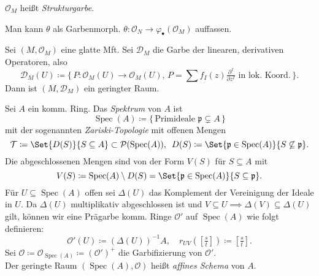 \documentclass{cheat-sheet}
\renewcommand{\O}{\mathcal{O}} %
\newcommand{\Tau}{\mathcal{T}} %
\DeclareMathOperator{\Spec}{Spec} %
\newcommand{\Pow}{\mathcal{P}} %
\begin{document}
\begin{sprech}
  $\O_M$ heißt \emph{Strukturgarbe}.
\end{sprech}


\begin{bem}
  Man kann $\theta$ als Garbenmorph. $\theta : \O_N \to \varphi_\bullet(\O_M)$ auffassen.
\end{bem}

\begin{bsp}
  Sei $(M, \O_M)$ eine glatte Mft. Sei $\mathcal{D}_M$ die Garbe der linearen, derivativen Operatoren, also
  \[ \mathcal{D}_M(U) \!\coloneqq\! \{ \, P \!:\! \O_M(U) \!\to\! \O_M(U), \, P \!=\! \sum f_I(z) \tfrac{\partial^I}{\partial z^I} \text{ in lok. Koord.} \, \}. \]
  Dann ist $(M, \mathcal{D}_M)$ ein geringter Raum. %
\end{bsp}



\begin{defn}
  Sei $A$ ein komm. Ring. Das \emph{Spektrum} von $A$ ist
  \[ \Spec(A) \coloneqq \{ \, \text{Primideale $\mathfrak{p} \subsetneq A$} \, \} \]
  mit der sogenannten \emph{Zariski-Topologie} mit offenen Mengen
  \[
    \Tau \coloneqq \Set{D(S)}{S \subseteq A} \subset \Pow(\Spec(A)), \enspace
    D(S) \coloneqq \Set{\mathfrak{p} \in \Spec(A)}{S \not\subseteq \mathfrak{p}}.
  \]
  Die abgeschlossenen Mengen sind von der Form $V(S)$ für $S \subseteq A$ mit
  \[
    V(S) \coloneqq \Spec(A) \setminus D(S) = \Set{\mathfrak{p} \in \Spec(A)}{S \subseteq \mathfrak{p}}.
  \]
  Für $U \subseteq \Spec(A)$ offen sei $\Delta(U)$ das Komplement der Vereinigung der Ideale in $U$.
  Da $\Delta(U)$ multiplikativ abgeschlossen ist und $V \subseteq U \!\implies\! \Delta(V) \subseteq \Delta(U)$ gilt, können wir eine Prägarbe komm. Ringe $\O'$ auf $\Spec(A)$ wie folgt definieren:
  \[
    \O'(U) \coloneqq (\Delta(U))^{-1} A, \quad
    r_{UV}(\left[\tfrac{s}{t}\right]) \coloneqq \left[\tfrac{s}{t}\right].
  \]
  Sei $\O \coloneqq \O_{\Spec(A)} \coloneqq (\O')^+$ die Garbifizierung von $\O'$. \\
  Der geringte Raum $(\Spec(A), \O)$ heißt \emph{affines Schema} von $A$.
\end{defn}
\end{document}
